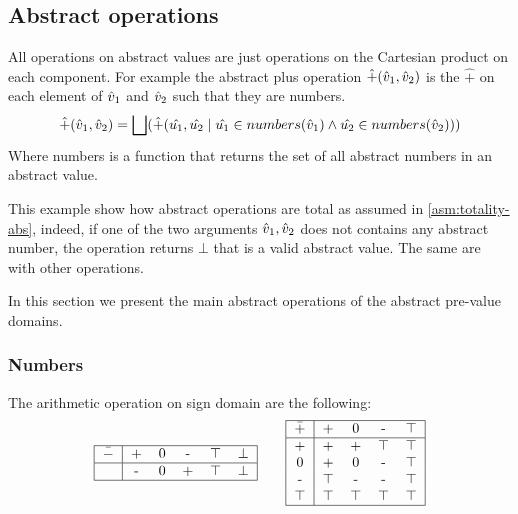 \subsection{Abstract operations} %
\label{sec:AbstractOp}
All operations on abstract values are just operations on the Cartesian product on each component. For example the abstract plus operation $\hat{+}(\hat{v}_1, \hat{v}_2)$ is the $\hat{+}$ on each element of $\hat{v}_1$ and $\hat{v}_2$ such that they are numbers.
\begin{align*}
\hat{+}(\hat{v}_1, \hat{v}_2) = \bigsqcup(\hat{+}(\hat{u_1}, \hat{u_2} \mid \hat{u_1} \in numbers(\hat{v}_1) \wedge \hat{u_2} \in numbers(\hat{v}_2)))
\end{align*}
Where numbers is a function that returns the set of all abstract numbers in an abstract value.

This example show how abstract operations are total as assumed in \ref{asm:totality-abs}, indeed, if one of the two arguments $\hat{v}_1, \hat{v}_2$ does not contains any abstract number, the operation returns $\bot$ that is a valid abstract value. The same are with other operations.

In this section we present the main abstract operations of the abstract pre-value domains.

\subsubsection{Numbers}
The arithmetic operation on sign domain are the following:
\begin{align*}
\begin{tabular}{ | c | *{5}{c}|}
  \hline                       
  $\bar{-}$ & + & 0 & - & $\top$ & $\bot$ \\
  \hline
   & - & 0 & + & $\top$ & $\bot$ \\
  \hline  
\end{tabular}
\qquad 
\begin{tabular}{ | c | *{4}{c}|}
  \hline                       
  $\bar{+}$ & + & 0 & - & $\top$ \\
  \hline
   + & + & + & $\top$ & $\top$\\
   0 & + & 0 & - & $\top$\\
   - & $\top$ & - & - & $\top$\\
   $\top$ & $\top$ & $\top$ & $\top$ & $\top$\\
  \hline  
\end{tabular}
\end{align*}

